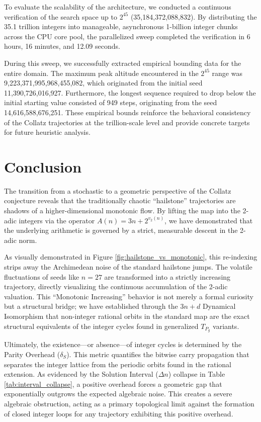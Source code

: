 \documentclass[11pt, a4paper]{article}
\theoremstyle{definition}
\begin{document}
To evaluate the scalability of the architecture, we conducted a continuous verification of the search space up to $2^{45}$ (35,184,372,088,832). By distributing the 35.1 trillion integers into manageable, asynchronous 1-billion integer chunks across the CPU core pool, the parallelized sweep completed the verification in 6 hours, 16 minutes, and 12.09 seconds.

During this sweep, we successfully extracted empirical bounding data for the entire domain. The maximum peak altitude encountered in the $2^{45}$ range was 9,223,371,995,968,455,082, which originated from the initial seed 11,390,726,016,927. Furthermore, the longest sequence required to drop below the initial starting value consisted of 949 steps, originating from the seed 14,616,588,676,251. These empirical bounds reinforce the behavioral consistency of the Collatz trajectories at the trillion-scale level and provide concrete targets for future heuristic analysis.

\section{Conclusion}

The transition from a stochastic to a geometric perspective of the Collatz conjecture reveals that the traditionally chaotic ``hailstone'' trajectories are shadows of a higher-dimensional monotonic flow. By lifting the map into the 2-adic integers via the operator $A(n) = 3n + 2^{v_2(n)}$, we have demonstrated that the underlying arithmetic is governed by a strict, measurable descent in the 2-adic norm. 

As visually demonstrated in Figure \ref{fig:hailstone_vs_monotonic}, this re-indexing strips away the Archimedean noise of the standard hailstone jumps. The volatile fluctuations of seeds like $n=27$ are transformed into a strictly increasing trajectory, directly visualizing the continuous accumulation of the 2-adic valuation. This ``Monotonic Increasing'' behavior is not merely a formal curiosity but a structural bridge; we have established through the $3n+d$ Dynamical Isomorphism that non-integer rational orbits in the standard map are the exact structural equivalents of the integer cycles found in generalized $T_{P_g}$ variants. 

Ultimately, the existence---or absence---of integer cycles is determined by the Parity Overhead ($\delta_S$). This metric quantifies the bitwise carry propagation that separates the integer lattice from the periodic orbits found in the rational extension. As evidenced by the Solution Interval ($\Delta n$) collapse in Table \ref{tab:interval_collapse}, a positive overhead forces a geometric gap that exponentially outgrows the expected algebraic noise. This creates a severe algebraic obstruction, acting as a primary topological limit against the formation of closed integer loops for any trajectory exhibiting this positive overhead. 
\end{document}
